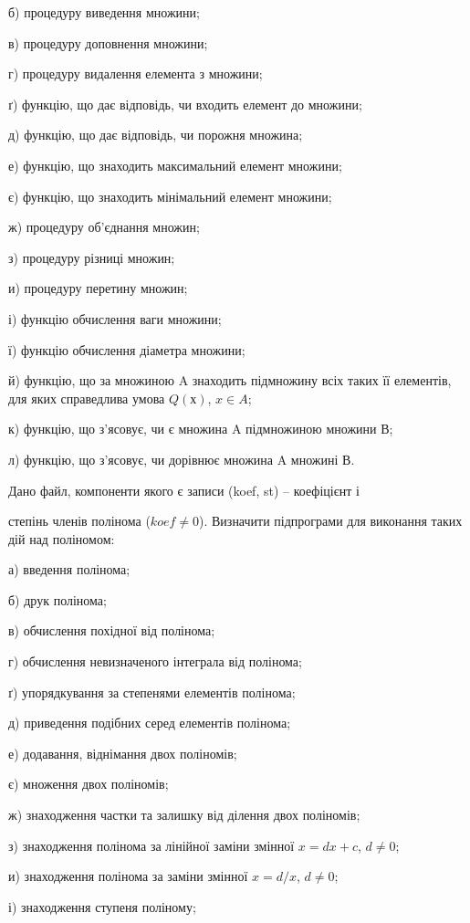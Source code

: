 \documentclass[]{article}
\begin{document}
б) процедуру виведення множини;

в) процедуру доповнення множини;

г) процедуру видалення елемента з множини;

ґ) функцію, що дає відповідь, чи входить елемент до множини;

д) функцію, що дає відповідь, чи порожня множина;

е) функцію, що знаходить максимальний елемент множини;

є) функцію, що знаходить мінімальний елемент множини;

ж) процедуру об'єднання множин;

з) процедуру різниці множин;

и) процедуру перетину множин;

і) функцію обчислення ваги множини;

ї) функцію обчислення діаметра множини;

й) функцію, що за множиною A знаходить підмножину всіх таких її
елементів, для яких справедлива умова $Q(х)$, $x\in A$;

к) функцію, що з'ясовує, чи є множина A підмножиною множини В;

л) функцію, що з'ясовує, чи дорівнює множина A множині В.

Дано файл, компоненти якого є записи (koef, st) -- коефіцієнт і

степінь членів полінома ($koef \neq 0$). Визначити підпрограми для виконання
таких дій над поліномом:

а) введення полінома;

б) друк полінома;

в) обчислення похідної від полінома;

г) обчислення невизначеного інтеграла від полінома;

ґ) упорядкування за степенями елементів полінома;

д) приведення подібних серед елементів полінома;

е) додавання, віднімання двох поліномів;

є) множення двох поліномів;

ж) знаходження частки та залишку від ділення двох поліномів;

з) знаходження полінома за лінійної заміни змінної $x = dx + c$, $d \neq 0$;

и) знаходження полінома за заміни змінної $x = d/x$, $d \neq 0$;

і) знаходження ступеня поліному;
\end{document}
